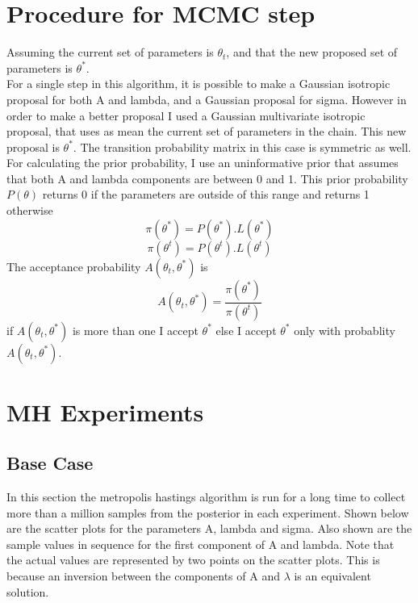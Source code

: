 \documentclass{article}
\begin{document}
\section{Procedure for MCMC step} %
Assuming the current set of parameters is $\theta_t$, and that the new proposed set of parameters is $\theta^*$.
\\
For a single step in this algorithm, it is possible to make a Gaussian isotropic proposal for both A and lambda, and a Gaussian proposal for sigma. However in order to make a better proposal I used a Gaussian multivariate isotropic proposal, that uses as mean the current set of parameters in the chain. This new proposal is $\theta^*$. The transition probability matrix in this case is symmetric as well. 
For calculating the prior probability, I use an uninformative prior that assumes that both A and lambda components are between 0 and 1. This prior probability $P(\theta)$ returns 0 if the parameters are outside of this range and returns 1 otherwise\\
\[
\pi(\theta^*) = P(\theta^*).L(\theta^*)
\]
\[
\pi(\theta^t) = P(\theta^t).L(\theta^t)
\]
The acceptance probability $A(\theta_t, \theta^*)$ is
\[
A(\theta_t, \theta^*) = \frac{\pi(\theta^*)}{\pi(\theta^t)}
\]
if $A(\theta_t, \theta^*)$ is more than one I accept $\theta^*$ else I accept $\theta^*$ only with probablity $A(\theta_t, \theta^*)$.

\newpage
\section{MH Experiments} %

\subsection{Base Case} %
In this section the metropolis hastings algorithm is run for a long time to collect more than a million samples from the posterior in each experiment. Shown below are the scatter plots for the parameters A, lambda and sigma. Also shown are the sample values in sequence for the first component of A and lambda. Note that the actual values are represented by two points on the scatter plots. This is because an inversion between the components of A and $\lambda$ is an equivalent solution.
\end{document}
